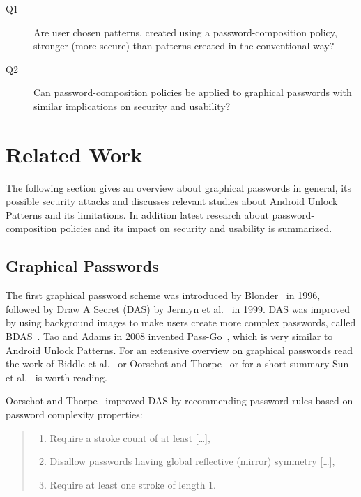 \documentclass[twocolumn, a4paper, 10pt]{article}
\begin{document}
\begin{description}
	\item[Q1]  Are user chosen patterns, created using a password-composition policy, stronger (more secure) than patterns created in the conventional way?
	\item[Q2] Can password-composition policies be applied to graphical passwords with similar implications on security and usability?
\end{description}
  
  
\section{Related Work}
\label{sec:related}
The following section gives an overview about graphical passwords in general, its possible security attacks  and discusses relevant studies about Android Unlock Patterns and its limitations. In addition latest research about password-composition policies and its impact on security and usability is summarized.


\subsection{Graphical Passwords}
\label{sec:related:grafical}

The first graphical password scheme was introduced by Blonder~\cite{blonder1996graphical} in 1996, followed by Draw A Secret (DAS) by Jermyn et al.~\cite{Jermyn:1999:DAG:1251421.1251422} in 1999. DAS was improved by using background images to make users create more complex passwords, called BDAS~\cite{Dunphy:2010:CLR:1837110.1837114}. Tao and Adams in 2008 invented Pass-Go~\cite{tao2008pass}, which is very similar to Android Unlock Patterns. For an extensive overview on graphical passwords read the work of Biddle et al.~\cite{Biddle:2012:GPL:2333112.2333114} or Oorschot and Thorpe~\cite{Oorschot:2008:PMU:1284680.1284685} or for a  short summary Sun et al.~\cite{Sun2014308} is worth reading.

Oorschot and Thorpe~\cite{Oorschot:2008:PMU:1284680.1284685} improved DAS by recommending password rules based on password complexity properties:

\begin{quote}
	\small
	\begin{enumerate}
		\item Require a stroke count of at least [\dots],\\
		\item Disallow passwords having global reflective (mirror) symmetry [\dots],\\
		\item Require at least one stroke of length 1.
	\end{enumerate}
\end{quote}
\end{document}
